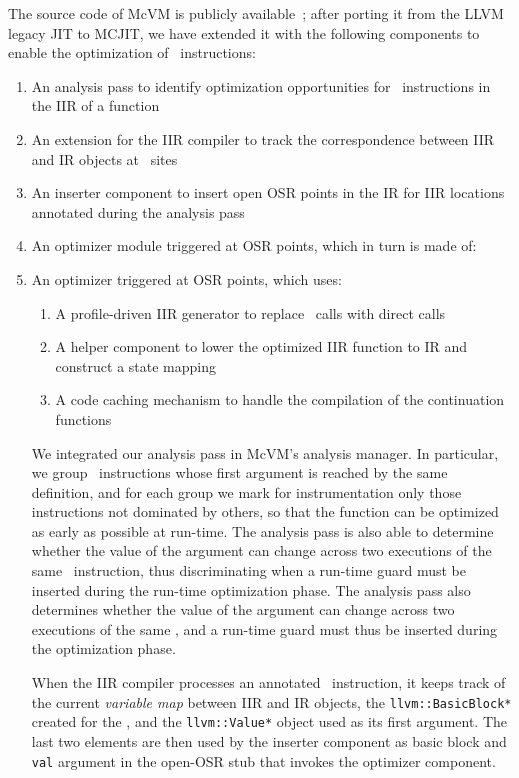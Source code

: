 The source code of McVM is publicly available~\cite{mcvm}; after porting it from the LLVM legacy JIT to MCJIT, we have extended it with the following components to enable the optimization of \feval\ instructions:
\begin{enumerate}
\item An analysis pass to identify optimization opportunities for \feval\ instructions in the IIR of a function
\item An extension for the IIR compiler to track the correspondence between IIR and IR objects at \feval\ sites
\item An inserter component to insert open OSR points in the IR for IIR locations annotated during the analysis pass
\ifdefined \fullver
\item An optimizer module triggered at OSR points, which in turn is made of:
\else
\item An optimizer triggered at OSR points, which uses:
\fi
\ifdefined \noauthorea
\begin{enumerate}
\else
\begin{enumerate}
\fi
\item A profile-driven IIR generator to replace \feval\ calls with direct calls
\item A helper component to lower the optimized IIR function to IR and construct a state mapping 
\item A code caching mechanism to handle the compilation of the continuation functions
\end{enumerate}
\end{enumerate}

We integrated our analysis pass in McVM's analysis manager. In particular, we group \feval\ instructions whose first argument is reached by the same definition, and for each group we mark for instrumentation only those instructions not dominated by others, so that the function can be optimized as early as possible at run-time. 
\ifdefined \fullver
The analysis pass is also able to determine whether the value of the argument can change across two executions of the same \feval\ instruction, thus discriminating when a run-time guard must be inserted during the run-time optimization phase.
\else
The analysis pass also determines whether the value of the argument can change across two executions of the same \feval, and a run-time guard must thus be inserted during the optimization phase.
\fi

When the IIR compiler processes an annotated \feval\ instruction, it keeps track of the current {\em variable map} between IIR and IR objects, the {\tt llvm::BasicBlock*} created for the \feval, and the {\tt llvm::Value*} object used as its first argument. The last two elements are then used by the inserter component as basic block and {\tt val} argument in the open-OSR stub that invokes the optimizer component.


\end{enumerate}
